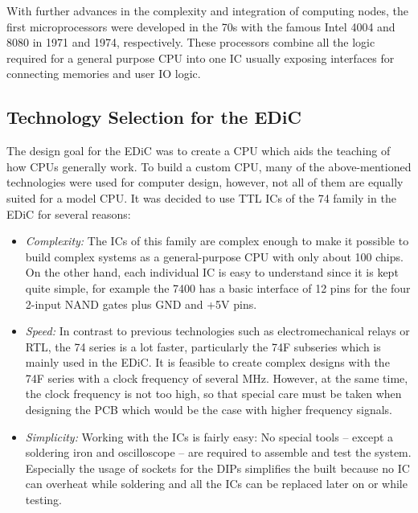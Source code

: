 With further advances in the complexity and integration of computing nodes, the first microprocessors were developed in the 70s with the famous Intel 4004 and 8080 in 1971 and 1974, respectively.
These processors combine all the logic required for a general purpose \gls{CPU} into one \gls{IC} usually exposing interfaces for connecting memories and user \gls{IO} logic.

\subsection{Technology Selection for the \gls{EDiC}}
The design goal for the \gls{EDiC} was to create a \gls{CPU} which aids the teaching of how \glspl{CPU} generally work.
To build a custom \gls{CPU}, many of the above-mentioned technologies were used for computer design, however, not all of them are equally suited for a model \gls{CPU}.
It was decided to use \gls{TTL} \glspl{IC} of the 74 family in the \gls{EDiC} for several reasons:
\begin{itemize}
  \item \emph{Complexity:} The \glspl{IC} of this family are complex enough to make it possible to build complex systems as a general-purpose \gls{CPU} with only about 100 chips.
  On the other hand, each individual \gls{IC} is easy to understand since it is kept quite simple, for example the 7400 has a basic interface of 12 pins for the four 2-input NAND gates plus GND and +5V pins.

  \item \emph{Speed:} In contrast to previous technologies such as electromechanical relays or \gls{RTL}, the 74 series is a lot faster, particularly the 74F subseries which is mainly used in the \gls{EDiC}.
  It is feasible to create complex designs with the 74F series with a clock frequency of several \unit{\mega\hertz}.
  However, at the same time, the clock frequency is not too high, so that special care must be taken when designing the \gls{PCB} which would be the case with higher frequency signals.

  \item \emph{Simplicity:} Working with the \glspl{IC} is fairly easy: No special tools -- except a soldering iron and oscilloscope -- are required to assemble and test the system.
  Especially the usage of sockets for the \glspl{DIP} simplifies the built because no \gls{IC} can overheat while soldering and all the \glspl{IC} can be replaced later on or while testing.
\end{itemize}

